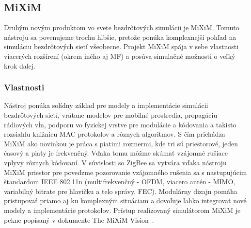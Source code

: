 \subsection{MiXiM}
\indent\indent Druhým novým produktom vo svete bezdrôtových simulácii je MiXiM. Tomuto nástroju sa povenujeme trochu hlbšie, pretože ponúka komplexnejší pohľad na simuláciu bezdrôtových sietí všeobecne. Projekt MiXiM spája v sebe vlastnosti viacerých rozšírení (okrem iného aj MF) a posúva simulačné možnosti o veľký krok ďalej.\\
\subsubsection{Vlastnosti}
\indent\indent Nástroj ponúka solídny základ pre modely a implementácie simulácii bezdrôtových sietí, vrátane modelov pre mobilné prostredia, propagáciu rádiových vĺn, podporu vo fyzickej vrstve pre modulácie a kódovania a takisto rozsiahlu knižnicu MAC protokolov a rôznych algoritmov. S čím prichádza MiXiM ako novinkou je práca s piatimi rozmermi, kde tri sú priestorové, jeden časový a piaty je frekvenčný. Vďaka tomu môžme skúmať vzájomné rušiace vplyvy rôznych kódovaní. V súvislosti so ZigBee sa vytvára vďaka nástroju MiXiM priestor pre povedzme pozorovanie vzájomného rušenia sa s nastupujúcim štandardom IEEE 802.11n (multifrekvenčný - OFDM, viacero antén - MIMO, variabilný bitrate pre hlavičku a telo správy, FEC). Modulárny dizajn pomáha pristupovať priamo aj ku komplexným situáciam a dovoľuje ľahko integrovať nové modely a implementácie protokolov. Prístup realizovaný simulátorom MiXiM je pekne popísaný v dokumente The MiXiM Vision~\cite{miximvision08}.\\
